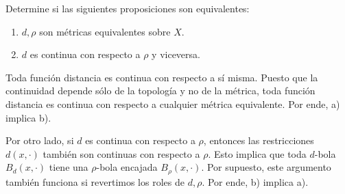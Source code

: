 \begin{exercise}
Determine si las siguientes proposiciones son equivalentes:
\begin{enumerate}[label=(\alph*)]
    \item $d, \rho$ son métricas equivalentes sobre $X$.
    \item $d$ es continua con respecto a $\rho$ y viceversa.
\end{enumerate}
\end{exercise}

\begin{solution}
Toda función distancia es continua con respecto a sí misma. Puesto que la continuidad depende sólo de la topología y no de la métrica, toda función distancia es continua con respecto a cualquier métrica equivalente. Por ende, a) implica b).

Por otro lado, si $d$ es continua con respecto a $\rho$, entonces las restricciones $d(x, \cdot)$ también son continuas con respecto a $\rho$. Esto implica que toda $d$-bola $B_d(x, \cdot)$ tiene una $\rho$-bola encajada $B_\rho(x, \cdot)$. Por supuesto, este argumento también funciona si revertimos los roles de $d, \rho$. Por ende, b) implica a).
\end{solution}
